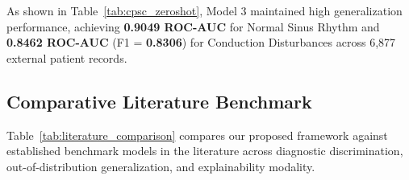 \documentclass[12pt]{elsarticle}
\begin{document}
\begin{table}[t]
\caption{Zero-Shot Benchmark Results on CPSC2018 Dataset (6,877 Records).}
\label{tab:cpsc_zeroshot}
\centering
\small
\setlength{\tabcolsep}{3.5pt}
\end{table}

As shown in Table~\ref{tab:cpsc_zeroshot}, Model 3 maintained high generalization performance, achieving \textbf{0.9049 ROC-AUC} for Normal Sinus Rhythm and \textbf{0.8462 ROC-AUC} (F1 = \textbf{0.8306}) for Conduction Disturbances across 6,877 external patient records.

\subsection{Comparative Literature Benchmark}
Table~\ref{tab:literature_comparison} compares our proposed framework against established benchmark models in the literature across diagnostic discrimination, out-of-distribution generalization, and explainability modality.
\end{document}
